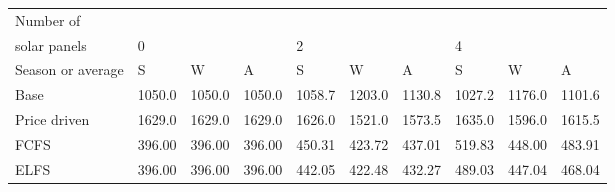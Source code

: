 \begin{table}[h] 
\centering 
\begin{tabular}{l|lll|lll|lll}Number of \\ solar panels&0& & &2& & &4& & \\ \hline 
Season or average & S & W & A & S & W & A & S & W & A \\ \hline 
Base&1050.0&1050.0&1050.0&1058.7&1203.0&1130.8&1027.2&1176.0&1101.6 \\ 
Price driven&1629.0&1629.0&1629.0&1626.0&1521.0&1573.5&1635.0&1596.0&1615.5 \\ 
FCFS&396.00&396.00&396.00&450.31&423.72&437.01&519.83&448.00&483.91 \\ 
ELFS&396.00&396.00&396.00&442.05&422.48&432.27&489.03&447.04&468.04 \\ 
\end{tabular} 
\end{table}
